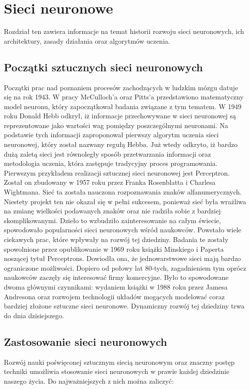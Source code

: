 \chapter{Sieci neuronowe}
\label{cha:sztuczne_sieci_neuronowe}

Rozdział ten zawiera informacje na temat historii rozwoju sieci neuronowych, ich architektury, zasady działania oraz algorytmów uczenia.

\section{Początki sztucznych sieci neuronowych}
Początki prac nad poznaniem procesów zachodzących w ludzkim mózgu datuje się na rok 1943. W pracy McCulloch'a oraz Pitts'a przedstawiono matematyczny model neuronu, który zapoczątkował badania związane z tym tematem. W 1949 roku Donald Hebb odkrył, iż informacje przechowywane w sieci neuronowej są reprezentowane jako wartości wag pomiędzy poszczególnymi neuronami. Na podstawie tych informacji zaproponował pierwszy algorytm uczenia sieci neuronowej, który został nazwany regułą Hebba. Już wtedy odkryto, iż bardzo dużą zaletą sieci jest równoległy sposób przetwarzania informacji oraz metodologia uczenia, która zastępuje tradycyjny proces programowania. Pierwszym przykładem realizacji sztucznej sieci neuronowej jest Perceptron. Został on zbudowany w 1957 roku przez Franka Rosenblatta i Charlesa Wightmana. Sieć ta została nauczona rozpoznawania znaków alfanumerycznych. Niestety projekt ten nie okazał się w pełni sukcesem, ponieważ sieć była wrażliwa na zmianę wielkości podawanych znaków oraz nie radziła sobie z bardziej skomplikowanymi. Dzieło to wzbudziło zainteresowanie na całym świecie, spowodowało popularności sieci neuronowych wśród naukowców. Powstało wiele ciekawych prac, które wpływały na rozwój tej dziedziny. Badania te zostały spowolnione przez opublikowanie w 1969 roku książki Minskiego i Paperta noszącej tytuł Perceptrons. Dowiodła ona, że jednowarstwowe sieci mają bardzo ograniczone możliwości. 
Dopiero od połowy lat 80-tych, zagadnieniem tym oprócz naukowców zaczęły się interesować firmy komercyjne. Było to spowodowane dwoma głównymi czynnikami: wydaniem książki w 1988 roku przez Jamesa Andresona oraz rozwojem technologii układów mogących modelować coraz bardziej złożone sztuczne sieci neuronowe. Dynamiczny rozwój tej dziedziny trwa do dnia dzisiejszego.

\section{Zastosowanie sieci neuronowych}
Rozwój nauki poświęconej sztucznym siecią neuronowym oraz znaczny postęp techniki umożliwia stosowanie sieci neuronowych w prawie każdej dziedzinie naszego życia. Do najważniejszych z nich można zaliczyć:

